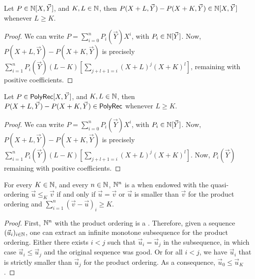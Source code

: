 \begin{fact}
    Let $P \in \mathbb{N}[X,\vec{Y}]$, and $K,L \in \mathbb{N}$,
    then $P(X+L, \vec{Y}) - P(X+K,\vec{Y}) \in \mathbb{N}[X, \vec{Y}]$
    whenever $L \geq K$.
\end{fact}
\begin{proof}
    We can write
    $P = \sum_{i = 0}^n P_i(\vec{Y}) X^i$, with $P_i \in \mathbb{N}[\vec{Y}]$.
    Now,
    $P(X+L,\vec{Y}) - P(X+K,\vec{Y})$
    is precisely
    $\sum_{i = 1}^n P_i(\vec{Y}) (L-K) \left[ \sum_{j + l + 1= i} (X+L)^j (X+K)^l \right]$,
    remaining with positive coefficients.
\end{proof}

\begin{fact}
    Let $P \in \mathsf{PolyRec}[X,\vec{Y}]$, and $K,L \in \mathbb{N}$,
    then $P(X+L, \vec{Y}) - P(X+K,\vec{Y}) \in \mathsf{PolyRec}$
    whenever $L \geq K$.
\end{fact}
\begin{proof}
    We can write
    $P = \sum_{i = 0}^n P_i(\vec{Y}) X^i$, with $P_i \in \mathbb{N}[\vec{Y}]$.
    Now,
    $P(X+L,\vec{Y}) - P(X+K,\vec{Y})$
    is precisely
    $\sum_{i = 1}^n P_i(\vec{Y}) (L-K) \left[ \sum_{j + l + 1= i} (X+L)^j (X+K)^l \right]$.
    Now, $P_i(\vec{Y})$
    remaining with positive coefficients.
\end{proof}
\begin{fact}
    For every $K \in \mathbb{N}$, and every $n \in \mathbb{N}$,
    $\mathbb{N}^n$ is a 
    when endowed with the quasi-ordering $\vec{u} \leq_K \vec{v}$
    if and only if $\vec{u} = \vec{v}$ or
    $\vec{u}$ is smaller than $\vec{v}$ for the product ordering and
    $\sum_{i = 1}^n  (\vec{v} - \vec{u})_i \geq K$.
\end{fact}
\begin{proof}
    First, $\mathbb{N}^n$ with the product ordering is a .
    Therefore, given a sequence $(\vec{u}_i)_{i \in \mathbb{N}}$,
    one can extract an infinite monotone subsequence for
    the product ordering.
    Either there exists $i < j$ such that $\vec{u}_i = \vec{u}_j$
    in the subsequence, in which case $\vec{u}_i \leq \vec{u}_j$
    and the original sequence was good. Or for all $i < j$,
    we have $\vec{u}_i$ that is strictly smaller than 
    $\vec{u}_j$ for the product ordering. As a consequence,
    $\vec{u}_0 \leq \vec{u}_K$.
\end{proof}



